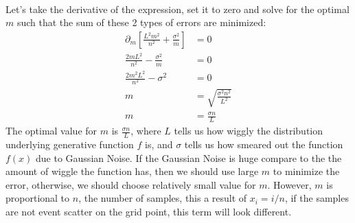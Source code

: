 \documentclass[]{article}
\begin{document}
        \\[1em]
        Let's take the derivative of the expression, set it to zero and solve for the optimal $m$ such that the sum of these 2 types of errors are minimized: 
        \begin{align*}\tag{B.1.e.3}\label{eqn:B.1.e.3}
            \partial_m 
            \left[ 
                \frac{L^2m^2}{n^2} + \frac{\sigma^2}{m}
            \right] &= 0
            \\
            \frac{2mL^2}{n^2} - \frac{\sigma^2}{m} &= 0
            \\
            \frac{2m^2L^2}{n^2} - \sigma^2 &= 0
            \\
            m &= \sqrt{\frac{\sigma^2 n^2}{L^2}}
            \\
            m &= \frac{\sigma n}{L}
        \end{align*}
        The optimal value for $m$ is $\frac{\sigma n}{L}$, where $L$ tells us how wiggly the distribution underlying generative function $f$ is, and $\sigma$ tells us how smeared out the function $f(x)$ due to Gaussian Noise. If the Gaussian Noise is huge compare to the the amount of wiggle the function has, then we should use large $m$ to minimize the error, otherwise, we should choose relatively small value for $m$. However, $m$ is proportional to $n$, the number of samples, this a result of $x_i = i/n$, if the samples are not event scatter on the grid point, this term will look different. 
        
\end{document}

